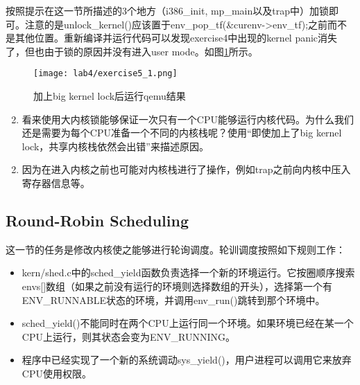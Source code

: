 \begin{exerciseSolution}{5}
    \par 按照提示在这一节所描述的3个地方（i386\_init, mp\_main以及trap中）加锁即可。注意的是unlock\_kernel()应该置于env\_pop\_tf(\&curenv->env\_tf);之前而不是其他位置。重新编译并运行代码可以发现exercise4中出现的kernel panic消失了，但也由于锁的原因并没有进入user mode。如图\ref{fig:lab4/exercise5_1}所示。
    \begin{figure}[htb]
        \centering
        \texttt{[image: lab4/exercise5\_1.png]}
        \caption{加上big kernel lock后运行qemu结果}
        \label{fig:lab4/exercise5_1}
    \end{figure}
\end{exerciseSolution}

\begin{questionEnv}
    \begin{enumerate}
        \setcounter{enumi}{1}
    \item 看来使用大内核锁能够保证一次只有一个CPU能够运行内核代码。为什么我们还是需要为每个CPU准备一个不同的内核栈呢？使用``即使加上了big kernel lock，共享内核栈依然会出错''来描述原因。
    \end{enumerate}
\end{questionEnv}
\begin{answer}
    \begin{enumerate}
        \setcounter{enumi}{1}
    \item 因为在进入内核之前也可能对内核栈进行了操作，例如trap之前向内核中压入寄存器信息等。
    \end{enumerate}
\end{answer}

\subsection{Round-Robin Scheduling}
\par 这一节的任务是修改内核使之能够进行轮询调度。轮训调度按照如下规则工作：
\begin{itemize}
    \item kern/shed.c中的sched\_yield函数负责选择一个新的环境运行。它按圈顺序搜索envs[]数组（如果之前没有运行的环境则选择数组的开头），选择第一个有ENV\_RUNNABLE状态的环境，并调用env\_run()跳转到那个环境中。
    \item sched\_yield()不能同时在两个CPU上运行同一个环境。如果环境已经在某一个CPU上运行，则其状态会变为ENV\_RUNNING。
    \item 程序中已经实现了一个新的系统调动sys\_yield()，用户进程可以调用它来放弃CPU使用权限。
\end{itemize}


